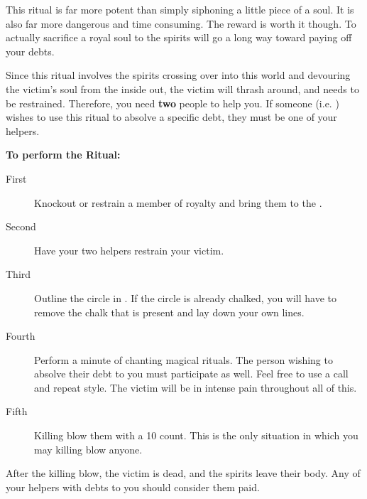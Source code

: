 \documentclass[green]{NeptuneBall}
\begin{document}
\name{\gRitual{}}

This ritual is far more potent than simply siphoning a little piece of a soul. It is also far more dangerous and time consuming. The reward is worth it though. To actually sacrifice a royal soul to the spirits will go a long way toward paying off your debts.

Since this ritual involves the spirits crossing over into this world and devouring the victim's soul from the inside out, the victim will thrash around, and needs to be restrained. Therefore, you need {\bf two} people to help you. If someone (i.e. \cAriel{}) wishes to use this ritual to absolve a specific debt, they must be one of your helpers.

{\bf To perform the Ritual:}
\begin{description}
\item[First] Knockout or restrain a member of royalty and bring them to the \sRunicCircle{}.
\item[Second] Have your two helpers restrain your victim.
\item [Third] Outline the circle in \iChalk{\MYname}. If the circle is already chalked, you will have to remove the chalk that is present and lay down your own lines.
\item[Fourth] Perform a minute of chanting magical rituals. The person wishing to absolve their debt to you must participate as well. Feel free to use a call and repeat style. The victim will be in intense pain throughout all of this.
\item[Fifth] Killing blow them with a 10 count. This is the only situation in which you may killing blow anyone.
\end{description}

After the killing blow, the victim is dead, and the spirits leave their body. Any of your helpers with debts to you should consider them paid.
\end{document}
